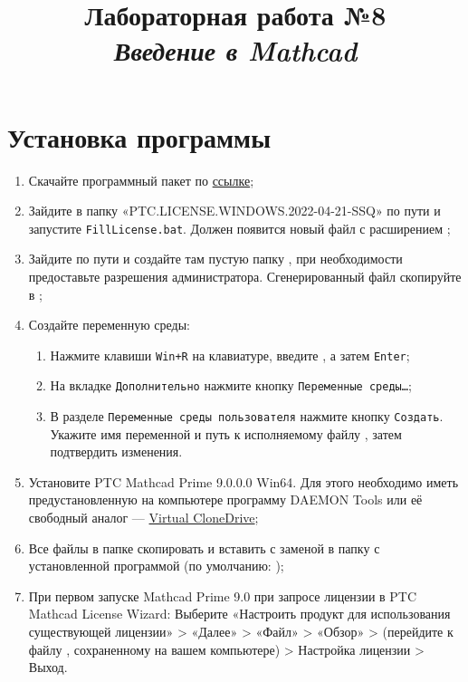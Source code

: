 \documentclass[14pt,a4paper]{article}
\title{Лабораторная работа №8 \\ \textit{Введение в Mathcad}}
\begin{document}
\maketitle

\progress{}
\section{Установка программы}
\begin{enumerate}
	\item Скачайте программный пакет по \href{https://mega.nz/folder/BJVHALjD#w-peT3ym3XjbBn78NVb9OA}{ссылке};
	\item Зайдите в папку «PTC.LICENSE.WINDOWS.2022-04-21-SSQ» по пути 
    и запустите \texttt{FillLicense.bat}. Должен появится новый файл с расширением ;
	\item Зайдите по пути  и создайте там пустую папку , при необходимости предоставьте разрешения администратора. Сгенерированный файл  скопируйте в ;
	\item Создайте переменную среды:
	\begin{enumerate}
		\item Нажмите клавиши \texttt{Win+R} на клавиатуре, введите , а затем \texttt{Enter};
		\item На вкладке \texttt{Дополнительно} нажмите кнопку \texttt{Переменные среды…};
		\item В разделе \texttt{Переменные среды пользователя} нажмите кнопку \texttt{Создать}. Укажите имя переменной  и путь к исполняемому файлу , затем подтвердить изменения.
	\end{enumerate}
	\item Установите PTC Mathcad Prime 9.0.0.0 Win64. Для этого необходимо иметь предустановленную на компьютере программу DAEMON Tools или её свободный аналог --- \href{https://mega.nz/file/Fd0T1JDA#HEkbzw68-mowukA16ODSRbXf7mGBfPjmXqBnG31CxF8}{Virtual CloneDrive};
	\item Все файлы в папке  скопировать и вставить с заменой в папку с установленной программой (по умолчанию: );
	\item При первом запуске Mathcad Prime 9.0 при запросе лицензии в PTC Mathcad License Wizard: Выберите «Настроить продукт для использования существующей лицензии» > «Далее» > «Файл» > «Обзор» > (перейдите к файлу , сохраненному на вашем компьютере) > Настройка лицензии > Выход.
\end{enumerate}
\end{document}
